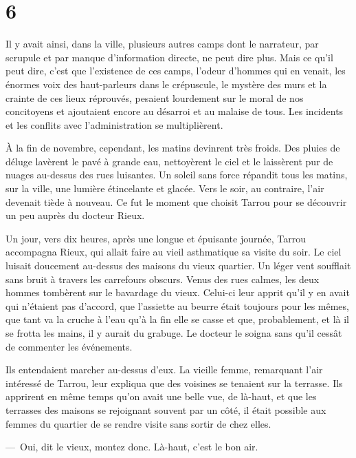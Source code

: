 \documentclass[french,twoside]{book} %
\begin{document}
\section[{6}]{6}
\noindent Il y avait ainsi, dans la ville, plusieurs autres camps dont le narrateur, par scrupule et par manque d’information directe, ne peut dire plus. Mais ce qu’il peut dire, c’est que l’existence de ces camps, l’odeur d’hommes qui en venait, les énormes voix des haut-parleurs dans le crépuscule, le mystère des murs et la crainte de ces lieux réprouvés, pesaient lourdement sur le moral de nos concitoyens et ajoutaient encore au désarroi et au malaise de tous. Les incidents et les conflits avec l’administration se multiplièrent.\par
À la fin de novembre, cependant, les matins devinrent très froids. Des pluies de déluge lavèrent le pavé à grande eau, nettoyèrent le ciel et le laissèrent pur de nuages au-dessus des rues luisantes. Un soleil sans force répandit tous les matins, sur la ville, une lumière étincelante et glacée. Vers le soir, au contraire, l’air devenait tiède à nouveau. Ce fut le moment que choisit Tarrou pour se découvrir un peu auprès du docteur Rieux.\par
Un jour, vers dix heures, après une longue et épuisante journée, Tarrou accompagna Rieux, qui allait faire au vieil asthmatique sa visite du soir. Le ciel luisait doucement au-dessus des maisons du vieux quartier. Un léger vent soufflait sans bruit à travers les carrefours obscurs. Venus des rues calmes, les deux hommes tombèrent sur le bavardage du vieux. Celui-ci leur apprit qu’il y en avait qui n’étaient pas d’accord, que l’assiette au beurre était toujours pour les mêmes, que tant va la cruche à l’eau qu’à la fin elle se casse et que, probablement, et là il se frotta les mains, il y aurait du grabuge. Le docteur le soigna sans qu’il cessât de commenter les événements.\par
Ils entendaient marcher au-dessus d’eux. La vieille femme, remarquant l’air intéressé de Tarrou, leur expliqua que des voisines se tenaient sur la terrasse. Ils apprirent en même temps qu’on avait une belle vue, de là-haut, et que les terrasses des maisons se rejoignant souvent par un côté, il était possible aux femmes du quartier de se rendre visite sans sortir de chez elles.\par
— Oui, dit le vieux, montez donc. Là-haut, c’est le bon air.\par
\end{document}
